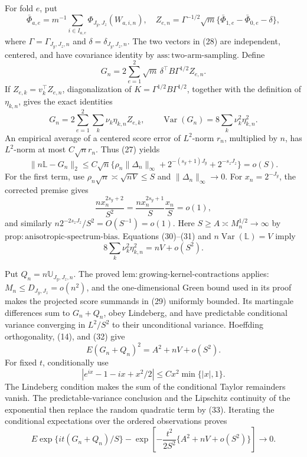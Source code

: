 For fold \(e\), put
\[
\bar\Phi_{a,e}=m^{-1}\sum_{i\in I_{a,e}}\Phi_{J_y,J_z}(W_{a,i,n}),
\quad
Z_{e,n}=\Gamma^{-1/2}\sqrt m\{\bar\Phi_{1,e}-\bar\Phi_{0,e}-\delta\},
\tag{28}
\]
where \(\Gamma=\Gamma_{J_y,J_z,n}\) and \(\delta=\delta_{J_y,J_z,n}\).  The two vectors in (28) are independent, centered, and have covariance identity by \(\mathrm{ass{:}two\text{-}arm\text{-}sampling}\).  Define
\[
G_n=2\sum_{e=1}^2\sqrt m\,\delta^{\top}B\Gamma^{1/2}Z_{e,n}.
\tag{29}
\]
If \(Z_{e,k}=v_k^{\top}Z_{e,n}\), diagonalization of \(K=\Gamma^{1/2}B\Gamma^{1/2}\), together with the definition of \(\eta_{k,n}\), gives the exact identities
\[
G_n=2\sum_{e=1}^2\sum_k\nu_k\eta_{k,n}Z_{e,k},
\qquad
\operatorname{Var}(G_n)=8\sum_k\nu_k^2\eta_{k,n}^2.
\tag{30}
\]
An empirical average of a centered score error of \(L^2\)-norm \(r_n\), multiplied by \(n\), has \(L^2\)-norm at most \(C\sqrt n r_n\).  Thus (27) yields
\[
\|n\mathbb L-G_n\|_2
\le C\sqrt n\{\rho_n\|\Delta_n\|_\infty+2^{-(s_y+1)J_y}+2^{-s_zJ_z}\}=o(S).
\tag{31}
\]
For the first term, use \(\rho_n\sqrt n\asymp\sqrt{nV}\le S\) and \(\|\Delta_n\|_\infty\to0\).  For \(x_n=2^{-J_y}\), the corrected premise gives
\[
\frac{n x_n^{2s_y+2}}{S^2}
=\frac{n x_n^{2s_y+1}}S\frac{x_n}S=o(1),
\]
and similarly \(n2^{-2s_zJ_z}/S^2=O(S^{-1})=o(1)\).  Here \(S\ge A\asymp M_n^{1/2}\to\infty\) by \(\mathrm{prop{:}anisotropic\text{-}spectrum\text{-}bias}\).  Equations (30)--(31) and \(n\operatorname{Var}(\mathbb L)=V\) imply
\[
8\sum_k\nu_k^2\eta_{k,n}^2=nV+o(S^2).
\tag{32}
\]

Put \(Q_n=n\mathbb U_{J_y,J_z,n}\).  The proved \(\mathrm{lem{:}growing\text{-}kernel\text{-}contractions}\) applies: \(M_n\le D_{J_y,J_z}=o(n^2)\), and the one-dimensional Green bound used in its proof makes the projected score summands in (29) uniformly bounded.  Its martingale differences sum to \(G_n+Q_n\), obey Lindeberg, and have predictable conditional variance converging in \(L^2/S^2\) to their unconditional variance.  Hoeffding orthogonality, (14), and (32) give
\[
E(G_n+Q_n)^2=A^2+nV+o(S^2).
\tag{33}
\]
For fixed \(t\), conditionally use
\[
|e^{ix}-1-ix+x^2/2|\le Cx^2\min\{|x|,1\}.
\]
The Lindeberg condition makes the sum of the conditional Taylor remainders vanish.  The predictable-variance conclusion and the Lipschitz continuity of the exponential then replace the random quadratic term by (33).  Iterating the conditional expectations over the ordered observations proves
\[
E\exp\{it(G_n+Q_n)/S\}
-\exp\!\left[-\frac{t^2}{2S^2}\{A^2+nV+o(S^2)\}\right]\longrightarrow0.
\tag{34}
\]

